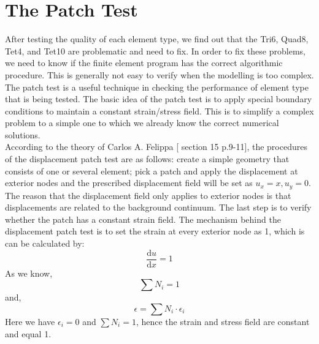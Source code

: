 \section{The Patch Test}
After testing the quality of each element type, we find out that the Tri6, Quad8, Tet4, and Tet10 are problematic and need to fix. In order to fix these problems, we need to know if the finite element program has the correct algorithmic procedure. This is generally not easy to verify when the modelling is too complex. The patch test is a useful technique in checking the performance of element type that is being tested. The basic idea of the patch test is to apply special boundary conditions to maintain a constant strain/stress field. This is to simplify a complex problem to a simple one to which we already know the correct numerical solutions. \\
According to the theory of Carlos A. Felippa [\cite{Felippa} section 15 p.9-11], the procedures of the displacement patch test are as follows: create a simple geometry that consists of one or several element; pick a patch and apply the displacement at exterior nodes and the prescribed displacement field will be set as $u_x = x, u_y = 0$. The reason that the displacement field only applies to exterior nodes is that displacements are related to the background continuum. The last step is to verify whether the patch has a constant strain field. The mechanism behind the displacement patch test is to set the strain at every exterior node as 1, which is can be calculated by:
\begin{equation}
\frac{\mathrm d u}{\mathrm d x} = 1
\end{equation}
As we know, 
\begin{equation}
\sum N_i = 1
\end{equation}
and, 
\begin{equation}
\epsilon = \sum N_i \cdot \epsilon_{i}
\end{equation}
Here we have $\epsilon_i = 0$ and $\sum N_i = 1$, hence the strain and stress field are constant and equal 1. \\
